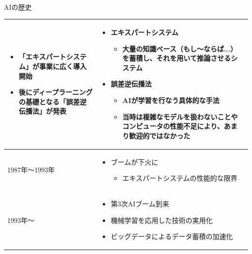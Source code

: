 \documentclass[dvipdfmx,aspectratio=169]{beamer}
\begin{document}
\begin{frame}[shrink]{AIの歴史}
\begin{table}[h]
\begin{tabular}{lp{35em}p{40em}}
\begin{minipage}{35em}
\begin{itemize}
													\item 「\alert{エキスパートシステム}」が事業に広く導入開始
													\item 後にディープラーニングの基礎となる「\alert{誤差逆伝播法}」が発表
												\end{itemize}
											\end{minipage}  
										& \begin{minipage}{40em}
											\begin{itemize}
												\item \alert{エキスパートシステム}
												\begin{itemize}
													\item 大量の知識ベース（もし～ならば...）を蓄積し、それを用いて推論させるシステム
												\end{itemize}
												\item \alert{誤差逆伝播法}
												\begin{itemize}
													\item AIが学習を行なう具体的な手法
													\item 当時は複雑なモデルを扱わないことやコンピュータの性能不足により、あまり歓迎的ではなかった
												\end{itemize}
											\end{itemize}
										\end{minipage}\\
				\midrule
				1987年～1993年            & \begin{minipage}{35em}
												\begin{itemize}
													\item ブームが下火に
													\begin{itemize}
														\item エキスパートシステムの性能的な限界
													\end{itemize}
												\end{itemize}
											\end{minipage} & \\
				\midrule
				1993年～                 & \begin{minipage}{40em}
												\begin{itemize}
													\item 第3次AIブーム到来
													\item \alert{機械学習}を応用した技術の実用化
													\item \alert{ビッグデータ}によるデータ蓄積の加速化

\end{itemize}
\end{minipage}
\end{tabular}
\end{table}
\end{frame}
\end{document}
